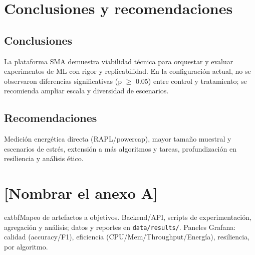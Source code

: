 \documentclass[12pt,twoside]{report}
\begin{document}
\chapter{Conclusiones y recomendaciones}
\section{Conclusiones}
La plataforma SMA demuestra viabilidad técnica para orquestar y evaluar experimentos de ML con rigor y replicabilidad. En la configuración actual, no se observaron diferencias significativas (p $\ge$ 0.05) entre control y tratamiento; se recomienda ampliar escala y diversidad de escenarios.

\section{Recomendaciones}
Medición energética directa (RAPL/powercap), mayor tamaño muestral y escenarios de estrés, extensión a más algoritmos y tareas, profundización en resiliencia y análisis ético.

\appendix
\chapter{[Nombrar el anexo A]}
	extbf{Mapeo de artefactos a objetivos.} Backend/API, scripts de experimentación, agregación y análisis; datos y reportes en \texttt{data/results/}. Paneles Grafana: calidad (accuracy/F1), eficiencia (CPU/Mem/Throughput/Energía), resiliencia, por algoritmo.

\printbibliography[heading=bibintoc,title={Bibliografía}]
\end{document}
